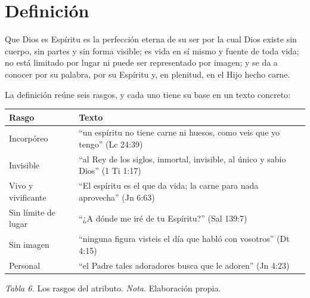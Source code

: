 
\section{Definición}

\begin{tcolorbox}[colback=papiro,colframe=azul,boxrule=1pt,arc=3pt,title={Definición},colbacktitle=azul,coltitle=papiro]
Que Dios es Espíritu es la perfección eterna de su ser por la cual Dios existe sin cuerpo, sin partes y sin forma visible; es vida en sí mismo y fuente de toda vida; no está limitado por lugar ni puede ser representado por imagen; y se da a conocer por su palabra, por su Espíritu y, en plenitud, en el Hijo hecho carne.
\end{tcolorbox}


La definición reúne seis rasgos, y cada uno tiene su base en un texto concreto:

\begin{center}\small\renewcommand{\arraystretch}{1.22}
\begin{tabular}{@{}L{3.6cm}L{10.6cm}@{}}
\toprule
\textbf{Rasgo} & \textbf{Texto} \\ \midrule
Incorpóreo & ``un espíritu no tiene carne ni huesos, como veis que yo tengo'' (Lc 24:39) \\
Invisible & ``al Rey de los siglos, inmortal, invisible, al único y sabio Dios'' (1 Ti 1:17) \\
Vivo y vivificante & ``El espíritu es el que da vida; la carne para nada aprovecha'' (Jn 6:63) \\
Sin límite de lugar & ``¿A dónde me iré de tu Espíritu?'' (Sal 139:7) \\
Sin imagen & ``ninguna figura visteis el día que \SENOR{} habló con vosotros'' (Dt 4:15) \\
Personal & ``el Padre tales adoradores busca que le adoren'' (Jn 4:23) \\
\bottomrule
\end{tabular}\par
{\footnotesize\color{gris}\textit{Tabla 6.} Los rasgos del atributo. \textit{Nota.} Elaboración propia.}
\end{center}

